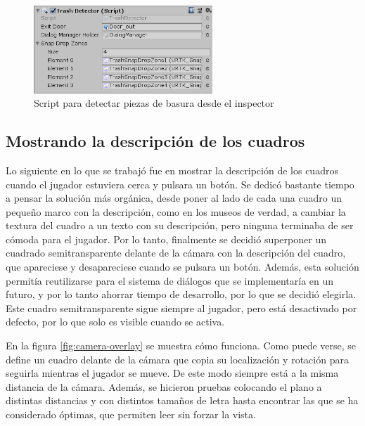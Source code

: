 \begin{figure}[!h]
\begin{center}
\includegraphics[width=0.6\textwidth]{imagenes/7/trash-detector.png}
\caption{Script para detectar piezas de basura desde el inspector}
\label{fig:trash-detector}
\end{center}
\vspace{-0.25cm}
\end{figure}

\subsection{Mostrando la descripción de los cuadros}

Lo siguiente en lo que se trabajó fue en mostrar la descripción de los cuadros cuando el jugador estuviera cerca y pulsara un botón. Se dedicó bastante tiempo a pensar la solución más orgánica, desde poner al lado de cada una cuadro un pequeño marco con la descripción, como en los museos de verdad, a cambiar la textura del cuadro a un texto con su descripción, pero ninguna terminaba de ser cómoda para el jugador. Por lo tanto, finalmente se decidió superponer un cuadrado semitransparente delante de la cámara con la descripción del cuadro, que apareciese y desapareciese cuando se pulsara un botón. Además, esta solución permitía reutilizarse para el sistema de diálogos que se implementaría en un futuro, y por lo tanto ahorrar tiempo de desarrollo, por lo que se decidió elegirla. Este cuadro semitransparente sigue siempre al jugador, pero está desactivado por defecto, por lo que solo es visible cuando se activa.

En la figura \ref{fig:camera-overlay} se muestra cómo funciona. Como puede verse, se define un cuadro delante de la cámara que copia su localización y rotación para seguirla mientras el jugador se mueve. De este modo siempre está a la misma distancia de la cámara. Además, se hicieron pruebas colocando el plano a distintas distancias y con distintos tamaños de letra hasta encontrar las que se ha considerado óptimas, que permiten leer sin forzar la vista.

